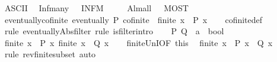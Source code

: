 \begin{isabellebody}
\isanewline
{}\isamarkupfalse%
\ {\isacharparenleft}{\kern0pt}ASCII{\isacharparenright}{\kern0pt}\isanewline
\ \ Inf{\isacharunderscore}{\kern0pt}many\ \ {\isacharparenleft}{\kern0pt}\ {\isachardoublequoteopen}INFM\ {\isachardoublequoteclose}\ {}{}{\isacharparenright}{\kern0pt}\ \isanewline
\ \ Alm{\isacharunderscore}{\kern0pt}all\ \ {\isacharparenleft}{\kern0pt}\ {\isachardoublequoteopen}MOST\ {\isachardoublequoteclose}\ {}{}{\isacharparenright}{\kern0pt}\isanewline
\isanewline
{}\isamarkupfalse%
\ eventually{\isacharunderscore}{\kern0pt}cofinite{\isacharcolon}{\kern0pt}\ {\isachardoublequoteopen}eventually\ P\ cofinite\ {\isasymlongleftrightarrow}\ finite\ {\isacharbraceleft}{\kern0pt}x{\isachardot}{\kern0pt}\ {\isasymnot}\ P\ x{\isacharbraceright}{\kern0pt}{\isachardoublequoteclose}\isanewline
%
\isadelimproof
\ \ %
\endisadelimproof
%
\isatagproof
{}\isamarkupfalse%
\ cofinite{\isacharunderscore}{\kern0pt}def\isanewline
{}\isamarkupfalse%
\ {\isacharparenleft}{\kern0pt}rule\ eventually{\isacharunderscore}{\kern0pt}Abs{\isacharunderscore}{\kern0pt}filter{\isacharcomma}{\kern0pt}\ rule\ is{\isacharunderscore}{\kern0pt}filter{\isachardot}{\kern0pt}intro{\isacharparenright}{\kern0pt}\isanewline
\ \ \isamarkupfalse%
\ P\ Q\ {\isacharcolon}{\kern0pt}{\isacharcolon}{\kern0pt}\ {\isachardoublequoteopen}{\isacharprime}{\kern0pt}a\ {\isasymRightarrow}\ bool{\isachardoublequoteclose}\ \isamarkupfalse%
\ {\isachardoublequoteopen}finite\ {\isacharbraceleft}{\kern0pt}x{\isachardot}{\kern0pt}\ {\isasymnot}\ P\ x{\isacharbraceright}{\kern0pt}{\isachardoublequoteclose}\ {\isachardoublequoteopen}finite\ {\isacharbraceleft}{\kern0pt}x{\isachardot}{\kern0pt}\ {\isasymnot}\ Q\ x{\isacharbraceright}{\kern0pt}{\isachardoublequoteclose}\isanewline
\ \ \isamarkupfalse%
\ finite{\isacharunderscore}{\kern0pt}UnI{\isacharbrackleft}{\kern0pt}OF\ this{\isacharbrackright}{\kern0pt}\ \isamarkupfalse%
\ {\isachardoublequoteopen}finite\ {\isacharbraceleft}{\kern0pt}x{\isachardot}{\kern0pt}\ {\isasymnot}\ {\isacharparenleft}{\kern0pt}P\ x\ {\isasymand}\ Q\ x{\isacharparenright}{\kern0pt}{\isacharbraceright}{\kern0pt}{\isachardoublequoteclose}\isanewline
\ \ \ \ \isamarkupfalse%
\ {\isacharparenleft}{\kern0pt}rule\ rev{\isacharunderscore}{\kern0pt}finite{\isacharunderscore}{\kern0pt}subset{\isacharparenright}{\kern0pt}\ auto\isanewline

\end{isabellebody}

